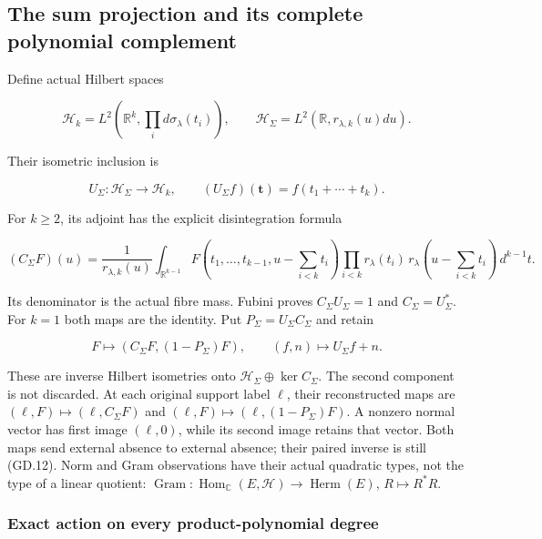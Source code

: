 \subsection[\hspace{0.4em}The sum projection and its complete polynomial
complement]{The sum projection and its complete polynomial
complement}\label{gammad-the-sum-projection-and-its-complete-polynomial-complement}

Define actual Hilbert spaces

\[
\mathcal H_k=L^2(\mathbb R^k,\prod_i d\sigma_\lambda(t_i)),\qquad
\mathcal H_\Sigma=L^2(\mathbb R,r_{\lambda,k}(u)du).
\]

Their isometric inclusion is

\[
U_\Sigma:\mathcal H_\Sigma\to\mathcal H_k,\qquad
(U_\Sigma f)(\mathbf t)=f(t_1+\cdots+t_k).                           \tag{GD.10}
\]

For \(k\ge2\), its adjoint has the explicit disintegration formula

\[
(C_\Sigma F)(u)=\frac{1}{r_{\lambda,k}(u)}
\int_{\mathbb R^{k-1}}
F(t_1,\ldots,t_{k-1},u-\sum_{i<k}t_i)
\prod_{i<k}r_\lambda(t_i)\,r_\lambda(u-\sum_{i<k}t_i)\,d^{k-1}t.
                                                                    \tag{GD.11}
\]

Its denominator is the actual fibre mass. Fubini proves
\(C_\Sigma U_\Sigma=1\) and \(C_\Sigma=U_\Sigma^*\). For \(k=1\) both
maps are the identity. Put \(P_\Sigma=U_\Sigma C_\Sigma\) and retain

\[
F\longmapsto(C_\Sigma F,(1-P_\Sigma)F),\qquad
(f,n)\longmapsto U_\Sigma f+n.                                      \tag{GD.12}
\]

These are inverse Hilbert isometries onto
\(\mathcal H_\Sigma\oplus\ker C_\Sigma\). The second component is not
discarded. At each original support label \(\ell\), their reconstructed
maps are \((\ell,F)\mapsto(\ell,C_\Sigma F)\) and
\((\ell,F)\mapsto(\ell,(1-P_\Sigma)F)\). A nonzero normal vector has
first image \((\ell,0)\), while its second image retains that vector.
Both maps send external absence to external absence; their paired
inverse is still (GD.12). Norm and Gram observations have their actual
quadratic types, not the type of a linear quotient:
\(\operatorname{Gram}:\operatorname{Hom}_{\mathbb C}(E,\mathcal H)
\to\operatorname{Herm}(E)\), \(R\mapsto R^*R\).

\subsubsection{Exact action on every product-polynomial
degree}\label{gammad-exact-action-on-every-product-polynomial-degree}

